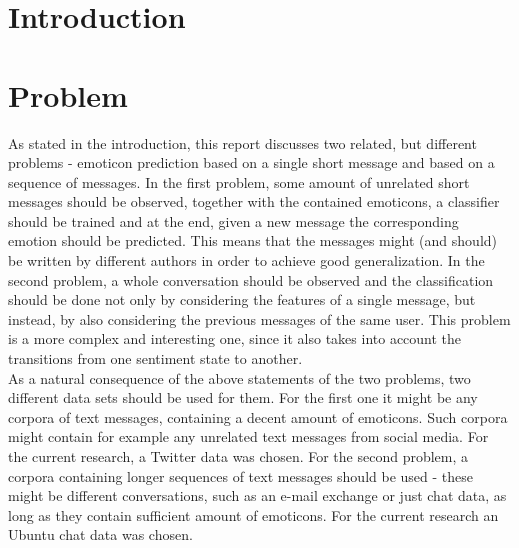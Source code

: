 \documentclass{article} %
\begin{document}
\section{Introduction}

\begin{comment}
Introduction (max 2 pages):
• Description of the problem area and the problem itself
• What is the research question / goal?
• Why is this an important / meaningful / interesting problem to consider?
• The very basic idea of the approach and why this is a reasonable approach for this problem?
\end{comment}


\section{Problem}

\begin{comment}
Problem: (roughly 1-2 pages)
• Explain the problem; what kind of assumptions / observations you have about the problem
\end{comment}


As stated in the introduction, this report discusses two related, but different problems - emoticon prediction based on a single short message and based on a sequence of messages. In the first problem, some amount of unrelated short messages should be observed, together with the contained emoticons, a classifier should be trained and at the end, given a new message the corresponding emotion should be predicted. This means that the messages might (and should) be written by different authors in order to achieve good generalization. In the second problem, a whole conversation should be observed and the classification should be done not only by considering the features of a single message, but instead, by also considering the previous messages of the same user. This problem is a more complex and interesting one, since it also takes into account the transitions from one sentiment state to another. \\

\noindent As a natural consequence of the above statements of the two problems, two different data sets should be used for them. For the first one it might be any corpora of text messages, containing a decent amount of emoticons. Such corpora might contain for example any unrelated text messages from social media. For the current research, a Twitter data was chosen. For the second problem, a corpora containing longer sequences of text messages should be used - these might be different conversations, such as an e-mail exchange or just chat data, as long as they contain sufficient amount of emoticons. For the current research an Ubuntu chat data was chosen. \\
\end{document}
